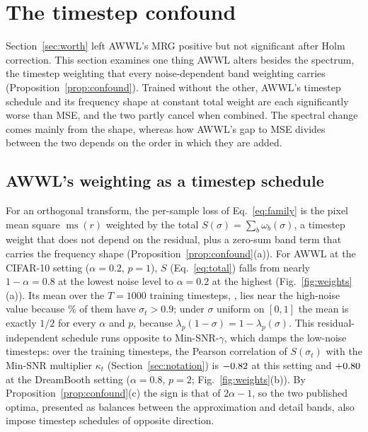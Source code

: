 \section{The timestep confound}
\label{sec:confound}

Section~\ref{sec:worth} left AWWL's MRG positive but not significant after
Holm correction. This section examines one thing AWWL alters besides the
spectrum, the timestep weighting that every noise-dependent band weighting
carries (Proposition~\ref{prop:confound}). Trained without the other, AWWL's
timestep schedule and its frequency shape at constant total weight are each
significantly worse than MSE, and the two partly cancel when combined. The
spectral change comes mainly from the shape, whereas how AWWL's gap to MSE
divides between the two depends on the order in which they are added.

\subsection{AWWL's weighting as a timestep schedule}
\label{sec:confound-schedule}

For an orthogonal transform, the per-sample loss of Eq.~\eqref{eq:family} is
the pixel mean square $\operatorname{ms}(r)$ weighted by the total
$S(\sigma) = \sum_b \omega_b(\sigma)$, a timestep weight that does not depend
on the residual, plus a zero-sum band term that carries the frequency shape
(Proposition~\ref{prop:confound}(a)). For AWWL at the CIFAR-10 setting
($\alpha = 0.2$, $p = 1$), $S$ (Eq.~\eqref{eq:total}) falls from nearly
$1 - \alpha = 0.8$ at the lowest noise level to $\alpha = 0.2$ at the highest
(Fig.~\ref{fig:weights}(a)). Its mean over the $T = \num{1000}$ training
timesteps, \wTotalMean, lies near the high-noise value because
\pctSigmaHigh\% of them have $\sigma_t > 0.9$; under $\sigma$ uniform on
$[0,1]$ the mean is exactly $1/2$ for every $\alpha$ and $p$, because
$\lambda_p(1-\sigma) = 1 - \lambda_p(\sigma)$. This residual-independent
schedule runs opposite to Min-SNR-$\gamma$, which damps the low-noise
timesteps: over the training timesteps, the Pearson correlation of
$S(\sigma_t)$ with the Min-SNR multiplier $\kappa_t$
(Section~\ref{sec:notation}) is $-0.82$ at this setting and
$+0.80$ at the DreamBooth setting ($\alpha = 0.8$, $p = 2$;
Fig.~\ref{fig:weights}(b)). By Proposition~\ref{prop:confound}(c) the sign is
that of $2\alpha - 1$, so the two published optima, presented as balances
between the approximation and detail bands, also impose timestep schedules of
opposite direction.


